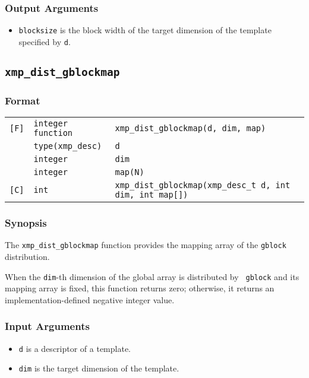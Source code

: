\subsubsection*{Output Arguments}
\begin{itemize}
 \item {\tt blocksize} is the block width of the target dimension of
       the template specified by {\tt d}.
\end{itemize}


\subsection{\tt xmp\_dist\_gblockmap}

\subsubsection*{Format}

\begin{tabular}{lll}

\verb![F]!& {\tt integer function}& {\tt xmp\_dist\_gblockmap(d, dim, map)}\\
          & {\tt type(xmp\_desc)} & {\tt d}\\
          & {\tt integer} & {\tt dim}\\
          & {\tt integer} & {\tt map(N)}\\

\verb![C]!&  {\tt int}& {\tt xmp\_dist\_gblockmap(xmp\_desc\_t d, int dim, int map[])}\\

\end{tabular}

\subsubsection*{Synopsis}

The {\tt xmp\_dist\_gblockmap} function provides the mapping array of the
{\tt gblock} distribution.

When the {\tt dim}-th dimension of the global array is distributed by {\tt
gblock} and its mapping array is fixed, this function returns zero;
otherwise, it returns an implementation-defined negative integer value.

\subsubsection*{Input Arguments}
\begin{itemize}
 \item {\tt d} is a descriptor of a template.
 \item {\tt dim} is the target dimension of the template.
\end{itemize}

